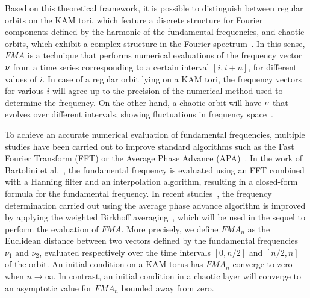 Based on this theoretical framework, it is possible to distinguish between regular orbits on the KAM tori, which feature a discrete structure for Fourier components defined by the harmonic of the fundamental frequencies, and chaotic orbits, which exhibit a complex structure in the Fourier spectrum~\cite{1288929}. In this sense, $FMA$ is a technique that performs numerical evaluations of the frequency vector $\vb{\nu}$ from a time series corresponding to a certain interval $[i, i+n]$, for different values of $i$. In case of a regular orbit lying on a KAM tori, the frequency vectors for various $i$ will agree up to the precision of the numerical method used to determine the frequency. On the other hand, a chaotic orbit will have $\vb{\nu}$ that evolves over different intervals, showing fluctuations in frequency space~\cite{laskar2000application}.

To achieve an accurate numerical evaluation of fundamental frequencies, multiple studies have been carried out to improve standard algorithms such as the Fast Fourier Transform (FFT) or the Average Phase Advance (APA)~\cite{laskar1992measure,Laskar1999, Bartolini:316949,bartolini1998computer}. In the work of Bartolini et al.~\cite{Bartolini:292773}, the fundamental frequency is evaluated using an FFT combined with a Hanning filter and an interpolation algorithm, resulting in a closed-form formula for the fundamental frequency. In recent studies~\cite{russo:ipac2021-thpab189}, the frequency determination carried out using the average phase advance algorithm is improved by applying the weighted Birkhoff averaging~\cite{Das_2018}, which will be used in the sequel to perform the evaluation of $FMA$.
More precisely, we define $FMA_n$ as the Euclidean distance between two vectors defined by the fundamental frequencies $\nu_1$ and $\nu_2$, evaluated respectively over the time intervals $[0, n/2]$ and $[n/2, n]$ of the orbit. An initial condition on a KAM torus has $FMA_n$ converge to zero when $n\to \infty$. In contrast, an initial condition in a chaotic layer will converge to an asymptotic value for $FMA_n$ bounded away from zero.
%
